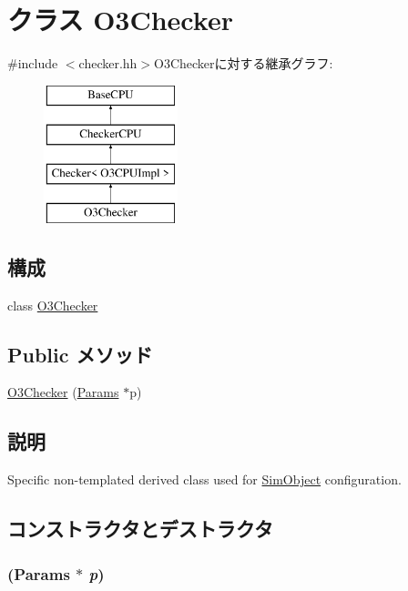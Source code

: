 \hypertarget{classO3Checker}{
\section{クラス O3Checker}
\label{classO3Checker}
}


{\ttfamily \#include $<$checker.hh$>$}O3Checkerに対する継承グラフ:\begin{figure}[H]
\begin{center}
\leavevmode
\includegraphics[height=4cm]{classO3Checker}
\end{center}
\end{figure}
\subsection*{構成}
\begin{DoxyCompactItemize}
\item 
class \hyperlink{classO3Checker_1_1O3Checker}{O3Checker}
\end{DoxyCompactItemize}
\subsection*{Public メソッド}
\begin{DoxyCompactItemize}
\item 
\hyperlink{classO3Checker_a3a9fb1b621019a5f408105a473cf0535}{O3Checker} (\hyperlink{classCheckerCPU_a56bf98a1e02b979e88cbf64420995961}{Params} $\ast$p)
\end{DoxyCompactItemize}


\subsection{説明}
Specific non-\/templated derived class used for \hyperlink{classSimObject}{SimObject} configuration. 

\subsection{コンストラクタとデストラクタ}
\hypertarget{classO3Checker_a3a9fb1b621019a5f408105a473cf0535}{
\subsubsection[{O3Checker}]{ ({\bf Params} $\ast$ {\em p})}}
\label{classO3Checker_a3a9fb1b621019a5f408105a473cf0535}



